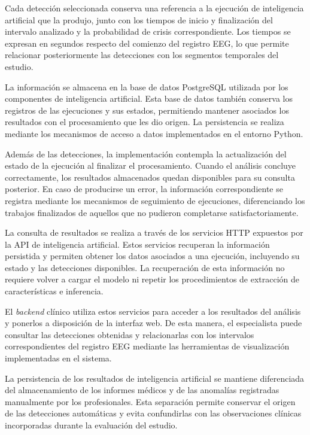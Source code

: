 Cada detección seleccionada conserva una referencia a la
ejecución de inteligencia artificial que la produjo, junto
con los tiempos de inicio y finalización del intervalo
analizado y la probabilidad de crisis correspondiente.
Los tiempos se expresan en segundos respecto del comienzo
del registro EEG, lo que permite relacionar posteriormente
las detecciones con los segmentos temporales del estudio.

La información se almacena en la base de datos PostgreSQL
utilizada por los componentes de inteligencia artificial.
Esta base de datos también conserva los registros de las
ejecuciones y sus estados, permitiendo mantener asociados
los resultados con el procesamiento que les dio origen.
La persistencia se realiza mediante los mecanismos de
acceso a datos implementados en el entorno Python.

Además de las detecciones, la implementación contempla
la actualización del estado de la ejecución al finalizar
el procesamiento. Cuando el análisis concluye correctamente,
los resultados almacenados quedan disponibles para su
consulta posterior. En caso de producirse un error, la
información correspondiente se registra mediante los
mecanismos de seguimiento de ejecuciones, diferenciando
los trabajos finalizados de aquellos que no pudieron
completarse satisfactoriamente.

La consulta de resultados se realiza a través de los
servicios HTTP expuestos por la API de inteligencia
artificial. Estos servicios recuperan la información
persistida y permiten obtener los datos asociados a una
ejecución, incluyendo su estado y las detecciones
disponibles. La recuperación de esta información no
requiere volver a cargar el modelo ni repetir los
procedimientos de extracción de características e
inferencia.

El \textit{backend} clínico utiliza estos servicios para acceder
a los resultados del análisis y ponerlos a disposición
de la interfaz web. De esta manera, el especialista
puede consultar las detecciones obtenidas y relacionarlas
con los intervalos correspondientes del registro EEG
mediante las herramientas de visualización implementadas
en el sistema.

La persistencia de los resultados de inteligencia
artificial se mantiene diferenciada del almacenamiento
de los informes médicos y de las anomalías registradas
manualmente por los profesionales. Esta separación
permite conservar el origen de las detecciones automáticas
y evita confundirlas con las observaciones clínicas
incorporadas durante la evaluación del estudio.

